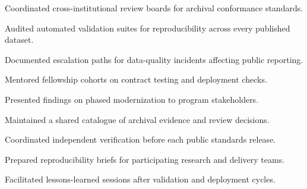\documentclass[fontsize=11pt, margin=narrow, medium=print]{careerdossier-resume}
\begin{document}
\begin{CDossierEntry}[title = {Postgraduate Fellowship in Reliability Engineering}, organization = {Standards and Accessibility Institute}, dates = {2026}]
  \begin{CDossierItemize}
    \item Coordinated cross-institutional review boards for archival conformance standards.
    \item Audited automated validation suites for reproducibility across every published dataset.
    \item Documented escalation paths for data-quality incidents affecting public reporting.
    \item Mentored fellowship cohorts on contract testing and deployment checks.
    \item Presented findings on phased modernization to program stakeholders.
    \item Maintained a shared catalogue of archival evidence and review decisions.
    \item Coordinated independent verification before each public standards release.
    \item Prepared reproducibility briefs for participating research and delivery teams.
    \item Facilitated lessons-learned sessions after validation and deployment cycles.
  \end{CDossierItemize}
\end{CDossierEntry}
\end{document}
